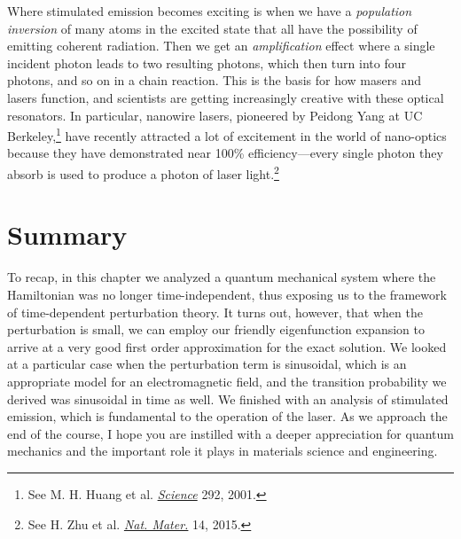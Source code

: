 Where stimulated emission becomes exciting is when we have a \emph{population inversion} of many atoms in the excited state that all have the possibility of emitting coherent radiation. 
Then we get an \emph{amplification} effect where a single incident photon leads to two resulting photons, which then turn into four photons, and so on in a chain reaction. 
This is the basis for how masers and lasers function, and scientists are getting increasingly creative with these optical resonators. 
In particular, nanowire lasers, pioneered by Peidong Yang at UC Berkeley,\footnote{See M. H. Huang et al. \href{http://science.sciencemag.org/content/292/5523/1897.full}{\emph{Science}} 292, 2001.} have recently attracted a lot of excitement in the world of nano-optics because they have demonstrated near 100\% efficiency---every single photon they absorb is used to produce a photon of laser light.\footnote{See H. Zhu et al. \href{http://www.nature.com/nmat/journal/v14/n6/full/nmat4271.html}{\emph{Nat. Mater.}} 14, 2015.}


\section{Summary}

To recap, in this chapter we analyzed a quantum mechanical system where the Hamiltonian was no longer time-independent, thus exposing us to the framework of time-dependent perturbation theory. 
It turns out, however, that when the perturbation is small, we can employ our friendly eigenfunction expansion to arrive at a very good first order approximation for the exact solution. 
We looked at a particular case when the perturbation term is sinusoidal, which is an appropriate model for an electromagnetic field, and the transition probability we derived was sinusoidal in time as well. 
We finished with an analysis of stimulated emission, which is fundamental to the operation of the laser.
As we approach the end of the course, I hope you are instilled with a deeper appreciation for quantum mechanics and the important role it plays in materials science and engineering.

%